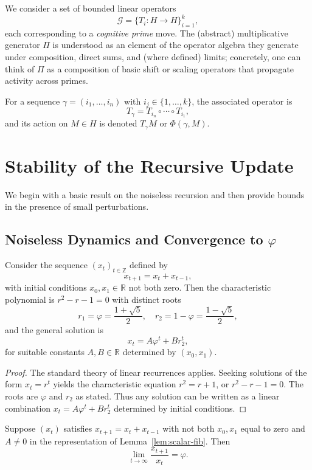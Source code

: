 \documentclass[11pt]{article}
\begin{document}
We consider a set of bounded linear operators
\[
\mathcal{G} = \{T_i : H \to H\}_{i=1}^k,
\]
each corresponding to a \emph{cognitive prime} move.
The (abstract) multiplicative generator $\Pi$ is understood as an element of the operator algebra they generate under composition, direct sums, and (where defined) limits; concretely, one can think of $\Pi$ as a composition of basic shift or scaling operators that propagate activity across primes.

For a sequence $\gamma = (i_1,\dots,i_n)$ with $i_j\in\{1,\dots,k\}$, the associated operator is
\[
T_\gamma = T_{i_n} \circ \cdots \circ T_{i_1},
\]
and its action on $M\in H$ is denoted $T_\gamma M$ or $\Phi(\gamma,M)$.

\section{Stability of the Recursive Update}

We begin with a basic result on the noiseless recursion and then provide bounds in the presence of small perturbations.

\subsection{Noiseless Dynamics and Convergence to $\varphi$}

\begin{lemma}
\label{lem:scalar-fib}
Consider the sequence $(x_t)_{t\in\mathbb{Z}}$ defined by
\[
x_{t+1} = x_t + x_{t-1},
\]
with initial conditions $x_0, x_1\in\mathbb{R}$ not both zero.
Then the characteristic polynomial is $r^2 - r - 1 = 0$ with distinct roots
\[
r_1 = \varphi = \frac{1+\sqrt{5}}{2}, \quad r_2 = 1-\varphi = \frac{1-\sqrt{5}}{2},
\]
and the general solution is
\[
x_t = A \varphi^t + B r_2^t,
\]
for suitable constants $A,B\in\mathbb{R}$ determined by $(x_0,x_1)$.
\end{lemma}

\begin{proof}
The standard theory of linear recurrences applies.
Seeking solutions of the form $x_t = r^t$ yields the characteristic equation $r^2 = r + 1$, or $r^2 - r - 1 = 0$.
The roots are $\varphi$ and $r_2$ as stated.
Thus any solution can be written as a linear combination $x_t = A \varphi^t + B r_2^t$ determined by initial conditions.
\end{proof}

\begin{proposition}
\label{prop:ratio-convergence}
Suppose $(x_t)$ satisfies $x_{t+1} = x_t + x_{t-1}$ with not both $x_0,x_1$ equal to zero and $A\neq 0$ in the representation of Lemma~\ref{lem:scalar-fib}.
Then
\[
\lim_{t\to\infty} \frac{x_{t+1}}{x_t} = \varphi.
\]
\end{proposition}
\end{document}
